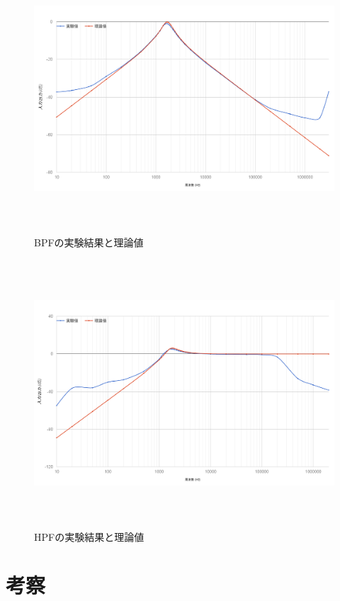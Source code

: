 \documentclass[11pt,a4j]{jsarticle}
\makeatletter
\newcommand{\figcaption}[1]{\def\@captype{figure}\caption{#1}}
\makeatother
\begin{document}
\begin{figure}[H]
  \centering
  \includegraphics[height=100mm,bb=0 0 1188 735]{image/BPF.png}
  \figcaption{BPFの実験結果と理論値}
  \label{fig:bpf}
\end{figure}

\begin{figure}[H]
  \centering
  \includegraphics[height=100mm,bb=0 0 1188 735]{image/HPF.png}
  \figcaption{HPFの実験結果と理論値}
  \label{fig:hpf}
\end{figure}



\section{考察}
\label{sec:考察}
\end{document}
